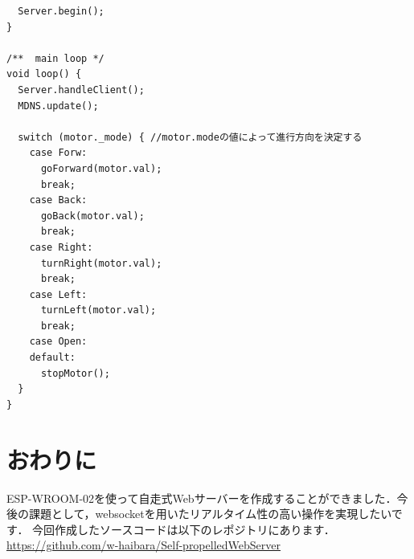 \begin{verbatim}
  Server.begin();
}

/**  main loop */
void loop() {
  Server.handleClient();
  MDNS.update();

  switch (motor._mode) { //motor.modeの値によって進行方向を決定する
    case Forw:
      goForward(motor.val);
      break;
    case Back:
      goBack(motor.val);
      break;
    case Right:
      turnRight(motor.val);
      break;
    case Left:
      turnLeft(motor.val);
      break;
    case Open:
    default:
      stopMotor();
  }
}
\end{verbatim}

\section{おわりに}
ESP-WROOM-02を使って自走式Webサーバーを作成することができました．今後の課題として，websocketを用いたリアルタイム性の高い操作を実現したいです．
今回作成したソースコードは以下のレポジトリにあります．\url{https://github.com/w-haibara/Self-propelledWebServer}
